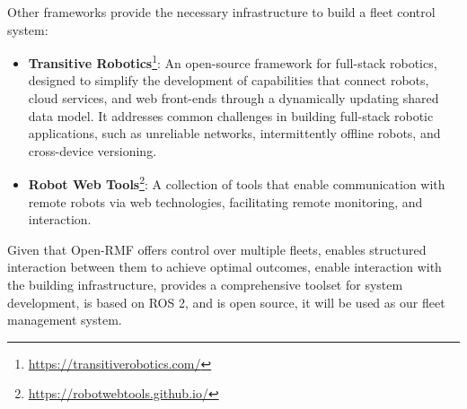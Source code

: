 Other frameworks provide the necessary infrastructure to build a fleet control system:
\begin{itemize}
	\item \textbf{Transitive Robotics}\footnote{\href{https://transitiverobotics.com/}{https://transitiverobotics.com/}}: An open-source framework for full-stack robotics, designed to simplify the development of capabilities that connect robots, cloud services, and web front-ends through a dynamically updating shared data model. It addresses common challenges in building full-stack robotic applications, such as unreliable networks, intermittently offline robots, and cross-device versioning.
	\item \textbf{Robot Web Tools}\footnote{\href{https://robotwebtools.github.io/}{https://robotwebtools.github.io/}}: A collection of tools that enable communication with remote robots via web technologies, facilitating remote monitoring, and interaction.
\end{itemize}
Given that Open-RMF offers control over multiple fleets, enables structured interaction between them to achieve optimal outcomes, enable interaction with the building infrastructure, provides a comprehensive toolset for system development, is based on ROS 2, and is open source, it will be used as our fleet management system.
